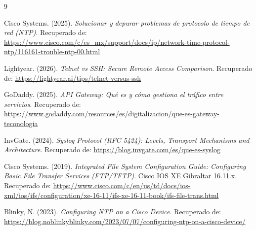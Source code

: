 \documentclass[a4paper,12pt]{article}
\begin{document}
\renewcommand{\refname}{Referencias (Formato APA 6)}
\begin{thebibliography}{9}

    Cisco Systems. (2025). \textit{Solucionar y depurar problemas de protocolo de tiempo de red (NTP)}. Recuperado de: \url{https://www.cisco.com/c/es_mx/support/docs/ip/network-time-protocol-ntp/116161-trouble-ntp-00.html}
    
    Lightyear. (2026). \textit{Telnet vs SSH: Secure Remote Access Comparison}. Recuperado de: \url{https://lightyear.ai/tips/telnet-versus-ssh}
    
    GoDaddy. (2025). \textit{API Gateway: Qué es y cómo gestiona el tráfico entre servicios}. Recuperado de: \url{https://www.godaddy.com/resources/es/digitalizacion/que-es-gateway-teconologia}
    
    InvGate. (2024). \textit{Syslog Protocol (RFC 5424): Levels, Transport Mechanisms and Architecture}. Recuperado de: \url{https://blog.invgate.com/es/que-es-syslog}
    
    Cisco Systems. (2019). \textit{Integrated File System Configuration Guide: Configuring Basic File Transfer Services (FTP/TFTP)}. Cisco IOS XE Gibraltar 16.11.x. Recuperado de: \url{https://www.cisco.com/c/en/us/td/docs/ios-xml/ios/ifs/configuration/xe-16-11/ifs-xe-16-11-book/ifs-file-trans.html}
    
    Blinky, N. (2023). \textit{Configuring NTP on a Cisco Device}. Recuperado de: \url{https://blog.noblinkyblinky.com/2023/07/07/configuring-ntp-on-a-cisco-device/}

\end{thebibliography}
\end{document}
